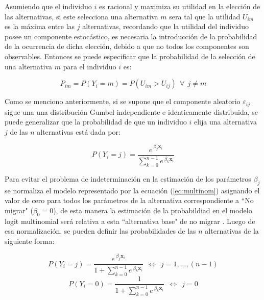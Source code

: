 \documentclass[12pt,a4paper]{article}
\begin{document}
Asumiendo que el individuo $i$ es racional y maximiza su utilidad en la elección de las  alternativas, si este selecciona una alternativa $m$ sera tal que la utilidad $U_{im}$ es la máxima entre las $j$ alternativas, recordando que la utilidad del individuo posee un componente estocástico, es necesaria la introducción de la probabilidad de la ocurrencia de dicha elección, debido a que no todos los componentes son observables. Entonces se puede especificar que  la probabilidad de la selección de una alternativa $m$ para el individuo $i$ es:
\begin {center}
\begin{equation}\label{eq:prob}
P_{im}=P{(Y_{i}=m)} =P(U_{im}>U_{ij}) \ \ \forall \ \ j\neq m
\end{equation}
\end {center}

Como se menciono anteriormente, si se supone que el componente aleatorio $\varepsilon_{ij}$ sigue una una distribución Gumbel independiente e identicamente distribuida, se puede generalizar que la probabilidad de que un individuo $i$ elija una alternativa $j$ de las $n$ alternativas está dada por:
\begin {center}
\begin{equation}\label{eq:multinom}
P{(Y_{i}=j)}=\frac{e^{\ \beta_{j} \textbf{x}_{i}}}{\sum_{k=0}^{n-1}e^{\ \beta_{k} \textbf{x}_{i}}}
\end{equation}
\end {center}

Para evitar el problema de indeterminación en la estimación de los parámetros $\beta_{j}$ se normaliza el modelo representado por la ecuación (\ref{eq:multinom}) asignando el valor de cero para todos los parámetros de la alternativa correspondiente a ``No migrar" ($\beta_{0}=0$), de esta manera la estimación de la probabildiad en el modelo logit multinomial será relativa a esta ``alternativa base" de no migrar \parencite{coxhead_migration_2015}.
Luego de esa normalización, se pueden definir las probabilidades de las $n$ alternativas de la siguiente forma:
\begin {center}
\begin{equation}\label{eq:multinom_2}
P{(Y_{i}=j)}=\frac{e^{\ \beta_{j} \textbf{x}_{i}}}{1+\sum_{k=0}^{n-1}e^{\ \beta_{k} \textbf{x}_{i}}} \ \ \Leftrightarrow \ \ j=1,...,(n-1)
\end{equation}
\begin{equation}\label{eq:multinom_3}
P{(Y_{i}=0)}=\frac{1}{1+\sum_{k=0}^{n-1}e^{\ \beta_{k} \textbf{x}_{i}}} \ \ \Leftrightarrow \ \ j=0
\end{equation}
\end {center}
\end{document}
